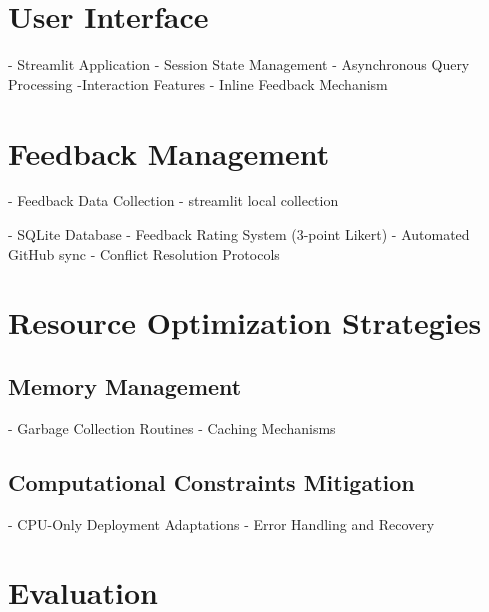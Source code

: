 \begin{spacing}{1.5}
\section{User Interface}
- Streamlit Application
      - Session State Management
      - Asynchronous Query Processing
-Interaction Features
      - Inline Feedback Mechanism

\section{Feedback Management}
- Feedback Data Collection
- streamlit local collection

      - SQLite Database
      - Feedback Rating System (3-point Likert)
      - Automated GitHub sync
      - Conflict Resolution Protocols

\section{Resource Optimization Strategies}
\subsection{Memory Management}
      - Garbage Collection Routines
      - Caching Mechanisms
\subsection{Computational Constraints Mitigation}
      - CPU-Only Deployment Adaptations
      - Error Handling and Recovery

\section{Evaluation}

\end{spacing}